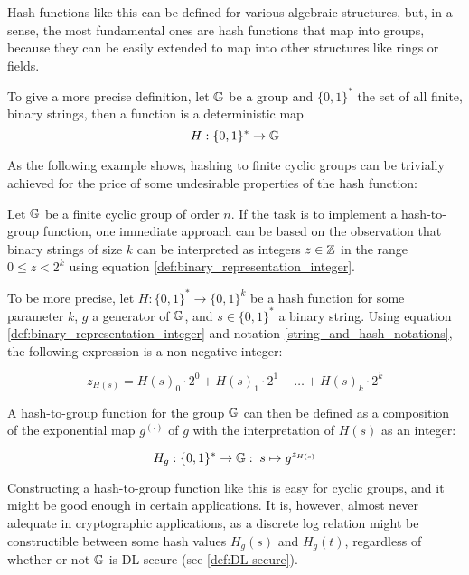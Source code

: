 Hash functions like this can be defined for various algebraic structures, but, in a sense, the most fundamental ones are hash functions that map into groups, because they can be easily extended to map into other structures like rings or fields.

To give a more precise definition, let $\mathbb{G}$ be a group and $\{0,1\}^*$ the set of all finite, binary strings, then a  function is a deterministic map
\begin{equation}
H : \{0,1\}^* \to \mathbb{G}
\end{equation}

As the following example shows, hashing to finite cyclic groups can be trivially achieved for the price of some undesirable properties of the hash function:

\begin{example}\label{naive-cyclic-group-hash} Let $\mathbb{G}$ be a finite cyclic group of order $n$. If the task is to implement a hash-to-group function, one immediate approach can be based on the observation that binary strings of size $k$ can be interpreted as integers $z\in\mathbb{Z}$ in the range $0\leq z < 2^k$ using equation \ref{def:binary_representation_integer}.

To be more precise, let $H:\{0,1\}^*\to \{0,1\}^k$ be a hash function for some parameter $k$, $g$ a generator of $\mathbb{G}$, and $s\in\{0,1\}^*$ a binary string. Using equation \ref{def:binary_representation_integer} and notation \ref{string_and_hash_notations}, the following expression is a non-negative integer:

\begin{equation}
z_{H(s)}= H(s)_0\cdot 2^0 + H(s)_1\cdot 2^1 + \ldots + H(s)_k \cdot 2^k
\end{equation}

A hash-to-group function for the group $\mathbb{G}$ can then be defined as a composition of the exponential map $g^{(\cdot)}$ of $g$ with the interpretation of $H(s)$ as an integer:

\begin{equation}
H_{g} : \{0,1\}^* \to \mathbb{G}:\; s \mapsto g^{z_{H(s)}}
\end{equation}

Constructing a hash-to-group function like this is easy for cyclic groups, and it might be good enough in certain applications. It is, however, almost never adequate in cryptographic applications, as a discrete log relation might be constructible between some hash values $H_g(s)$ and $H_g(t)$, regardless of whether or not $\mathbb{G}$ is DL-secure (see \secname \ref{def:DL-secure}).


\end{example}
